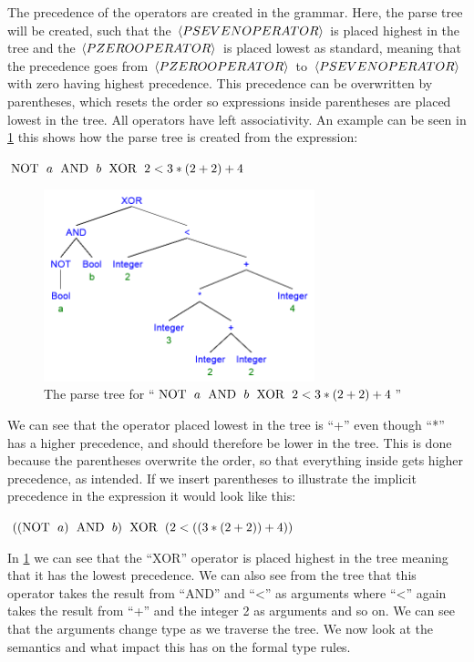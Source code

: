 The precedence of the operators are created in the grammar. Here, the parse tree will be created, such that the $\braket{PSEVENOPERATOR}$ is placed highest in the tree and the $\braket{PZEROOPERATOR}$ is placed lowest as standard, meaning that the precedence goes from $\braket{PZEROOPERATOR}$ to $\braket{PSEVENOPERATOR}$ with zero having highest precedence. This precedence can be overwritten by parentheses, which resets the order so expressions inside parentheses are placed lowest in the tree. All operators have left associativity. An example can be seen in \cref{precedenceExamples} this shows how the parse tree is created from the expression: \\
\begin{center}
$\text{NOT \;} a \text{\; AND \;} b \text{\; XOR \;} 2 < 3 * (2 + 2) + 4$
\end{center}

\begin{figure}[h]
\centering
\includegraphics[width=0.7\textwidth]{Design/Expressions/precidenceExamples.png}
\caption{The parse tree for \textnormal{\enquote{$\text{NOT \;} a \text{\; AND \;} b \text{\; XOR \;} 2 < 3 * (2 + 2) + 4$}}} %
\label{precedenceExamples}
\end{figure}

We can see that the operator placed lowest in the tree is \enquote{+} even though \enquote{*} has a higher precedence, and should therefore be lower in the tree. This is done because the parentheses overwrite the order, so that everything inside gets higher precedence, as intended. If we insert parentheses to illustrate the implicit precedence in the expression it would look like this:
\begin{center}
$((\text{NOT \;} a) \text{\; AND \;} b) \text{\; XOR \;} (2 < ((3 * (2 + 2)) + 4))$
\end{center}
In \cref{precedenceExamples} we can see that the \enquote{XOR} operator is placed highest in the tree meaning that it has the lowest precedence. We can also see from the tree that this operator takes the result from \enquote{AND} and \enquote{<} as arguments where \enquote{<} again takes the result from \enquote{+} and the integer 2 as arguments and so on. We can see that the arguments change type as we traverse the tree. We now look at the semantics and what impact this has on the formal type rules.

